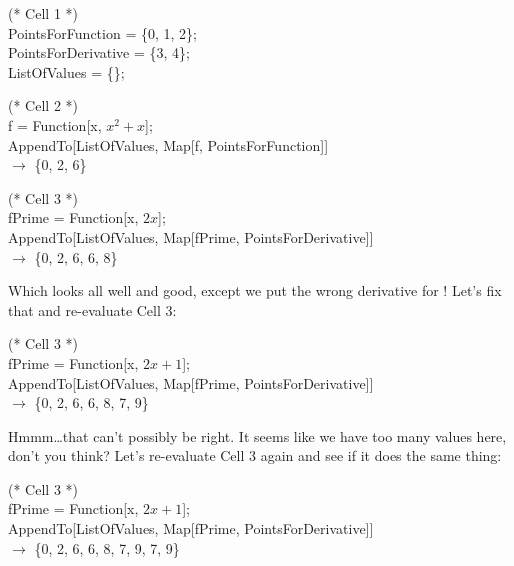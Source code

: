 \begin{code}
	   (* Cell 1 *)\\
	   PointsForFunction = \{0, 1, 2\};\\
	   PointsForDerivative = \{3, 4\};\\
	   ListOfValues = \{\};\\
\end{code}
	   
\begin{code}
	   (* Cell 2 *)\\
	   f = Function[x, $x^2 + x$];\\
	   AppendTo[ListOfValues, Map[f, PointsForFunction]]\\
	   $\rightarrow$ \{0, 2, 6\}\\
\end{code}
	   
\begin{code}
	   (* Cell 3 *)\\
	   fPrime = Function[x, $2x$];\\
	   AppendTo[ListOfValues, Map[fPrime, PointsForDerivative]]\\
	   $\rightarrow$ \{0, 2, 6, 6, 8\}\\
\end{code}

Which looks all well and good, except we put the wrong derivative for ! Let's fix that and re-evaluate Cell 3:

\begin{code}
	   (* Cell 3 *)\\
	   fPrime = Function[x, $2x + 1$];\\
	   AppendTo[ListOfValues, Map[fPrime, PointsForDerivative]]\\
	   $\rightarrow$ \{0, 2, 6, 6, 8, 7, 9\}\\
\end{code}

Hmmm\ldots that can't possibly be right. It seems like we have too many values here, don't you think? Let's re-evaluate Cell 3 again and see if it does the same thing:

\begin{code}
	   (* Cell 3 *)\\
	   fPrime = Function[x, $2x + 1$];\\
	   AppendTo[ListOfValues, Map[fPrime, PointsForDerivative]]\\
	   $\rightarrow$ \{0, 2, 6, 6, 8, 7, 9, 7, 9\}\\
\end{code}

